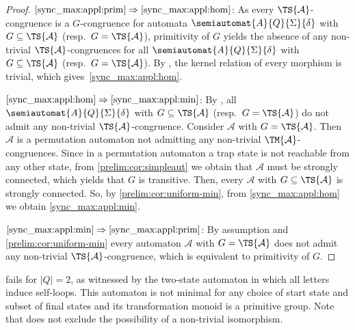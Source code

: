 \begin{proof}
$\ref{sync_max:appl:prim} \Rightarrow \ref{sync_max:appl:hom}$: 
As every $\TS{\mathcal A}$-congruence
is a $G$-congruence for automata $\semiautomat{A}{Q}{\Sigma}{\delta}$
with $G \subseteq \TS{\mathcal A}$ (resp.~$G = \TS{\mathcal A}$),
primitivity of $G$
yields the absence of any non-trivial $\TS{\mathcal A}$-congruences
for all $\semiautomat{A}{Q}{\Sigma}{\delta}$
with $G \subseteq \TS{\mathcal A}$ (resp.~$G = \TS{\mathcal A}$).
By ,
the kernel relation of every morphism is trivial,
which gives~\cref{sync_max:appl:hom}.


$\ref{sync_max:appl:hom} \Rightarrow \ref{sync_max:appl:min}$: 
By ,
all $\semiautomat{A}{Q}{\Sigma}{\delta}$
with $G \subseteq \TS{\mathcal A}$ (resp.~$G = \TS{\mathcal A}$)
do not admit any non-trivial $\TS{\mathcal A}$-congruence.
Consider $\mathcal A$ with $G = \TS{\mathcal A}$.
Then $\mathcal A$ is a permutation automaton not admitting any non-trivial $\TM{\mathcal A}$-congruences.
Since in a permutation automaton a trap state is not reachable from any other state, from
\cref{prelim:cor:simpleaut} 
we obtain that $\mathcal A$ must be strongly connected,
which yields that $G$ is transitive.
Then, every $\mathcal A$ with $G \subseteq \TS{\mathcal A}$
is strongly connected. 
So, by \cref{prelim:cor:uniform-min}, from \cref{sync_max:appl:hom} we obtain \cref{sync_max:appl:min}.

$\ref{sync_max:appl:min} \Rightarrow \ref{sync_max:appl:prim}$: 
By assumption and  \cref{prelim:cor:uniform-min} every automaton $\mathcal A$
with $G = \TS{\mathcal A}$ does not admit any non-trivial $\TS{\mathcal A}$-congruence,
which is equivalent to primitivity of $G$.
\end{proof}

 fails for $|Q| = 2$, 
as witnessed by the two-state automaton in which all letters induce self-loops. 
This automaton is not minimal for any choice of start state and subset of final states
and its transformation monoid is a primitive group.
Note that  does not exclude
the possibility of a non-trivial isomorphism.